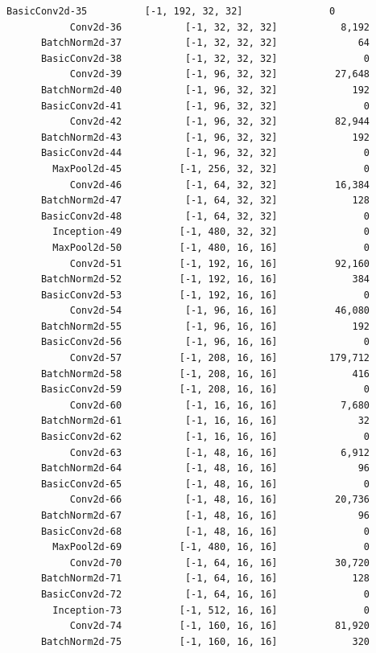 \documentclass[a4paper, 12pt]{article}
\begin{document}
\begin{lstlisting}[language=sh]
      BasicConv2d-35          [-1, 192, 32, 32]               0
           Conv2d-36           [-1, 32, 32, 32]           8,192
      BatchNorm2d-37           [-1, 32, 32, 32]              64
      BasicConv2d-38           [-1, 32, 32, 32]               0
           Conv2d-39           [-1, 96, 32, 32]          27,648
      BatchNorm2d-40           [-1, 96, 32, 32]             192
      BasicConv2d-41           [-1, 96, 32, 32]               0
           Conv2d-42           [-1, 96, 32, 32]          82,944
      BatchNorm2d-43           [-1, 96, 32, 32]             192
      BasicConv2d-44           [-1, 96, 32, 32]               0
        MaxPool2d-45          [-1, 256, 32, 32]               0
           Conv2d-46           [-1, 64, 32, 32]          16,384
      BatchNorm2d-47           [-1, 64, 32, 32]             128
      BasicConv2d-48           [-1, 64, 32, 32]               0
        Inception-49          [-1, 480, 32, 32]               0
        MaxPool2d-50          [-1, 480, 16, 16]               0
           Conv2d-51          [-1, 192, 16, 16]          92,160
      BatchNorm2d-52          [-1, 192, 16, 16]             384
      BasicConv2d-53          [-1, 192, 16, 16]               0
           Conv2d-54           [-1, 96, 16, 16]          46,080
      BatchNorm2d-55           [-1, 96, 16, 16]             192
      BasicConv2d-56           [-1, 96, 16, 16]               0
           Conv2d-57          [-1, 208, 16, 16]         179,712
      BatchNorm2d-58          [-1, 208, 16, 16]             416
      BasicConv2d-59          [-1, 208, 16, 16]               0
           Conv2d-60           [-1, 16, 16, 16]           7,680
      BatchNorm2d-61           [-1, 16, 16, 16]              32
      BasicConv2d-62           [-1, 16, 16, 16]               0
           Conv2d-63           [-1, 48, 16, 16]           6,912
      BatchNorm2d-64           [-1, 48, 16, 16]              96
      BasicConv2d-65           [-1, 48, 16, 16]               0
           Conv2d-66           [-1, 48, 16, 16]          20,736
      BatchNorm2d-67           [-1, 48, 16, 16]              96
      BasicConv2d-68           [-1, 48, 16, 16]               0
        MaxPool2d-69          [-1, 480, 16, 16]               0
           Conv2d-70           [-1, 64, 16, 16]          30,720
      BatchNorm2d-71           [-1, 64, 16, 16]             128
      BasicConv2d-72           [-1, 64, 16, 16]               0
        Inception-73          [-1, 512, 16, 16]               0
           Conv2d-74          [-1, 160, 16, 16]          81,920
      BatchNorm2d-75          [-1, 160, 16, 16]             320

\end{lstlisting}
\end{document}
